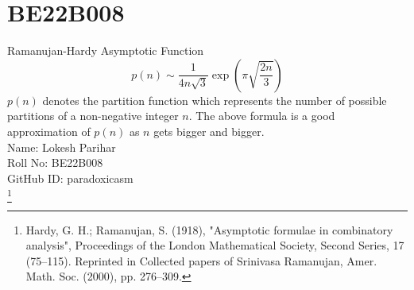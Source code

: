 \section{BE22B008}
\large {Ramanujan-Hardy Asymptotic Function} 
\begin{equation}
    {\displaystyle p(n)\sim {\frac {1}{4n{\sqrt {3}}}}\exp \left({\pi {\sqrt {\frac {2n}{3}}}}\right)} 
\end{equation}
$p(n)$ denotes the partition function which represents the number of possible partitions of a non-negative integer $n$.
The above formula is a good approximation of $p(n)$ as $n$ gets bigger and bigger. \\

Name: Lokesh Parihar \\
Roll No: BE22B008 \\
GitHub ID: paradoxicasm \\

\footnote{Hardy, G. H.; Ramanujan, S. (1918), "Asymptotic formulae in combinatory analysis", Proceedings of the London Mathematical Society, Second Series, 17 (75–115). Reprinted in Collected papers of Srinivasa Ramanujan, Amer. Math. Soc. (2000), pp. 276–309.}

